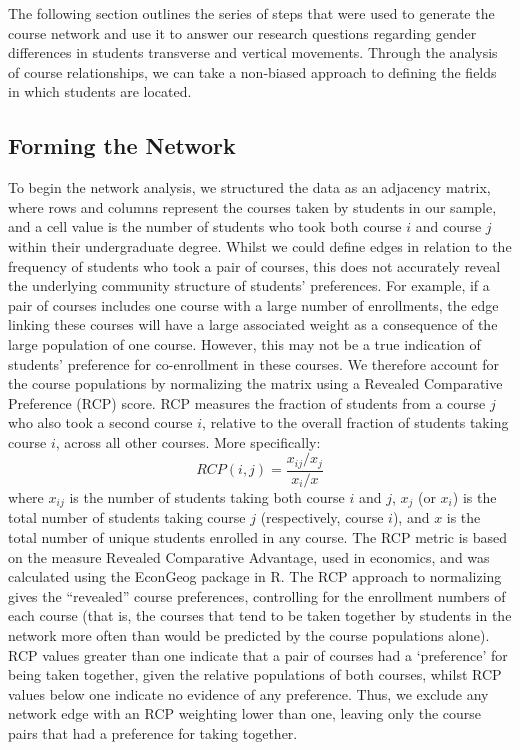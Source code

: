 The following section outlines the series of steps that were used to generate the course network and use it to answer our research questions regarding gender differences in students transverse and vertical movements. Through the analysis of course relationships, we can take a non-biased approach to defining the fields in which students are located. 

\subsection*{Forming the Network}
To begin the network analysis, we structured the data as an adjacency matrix, where rows and columns represent the courses taken by students in our sample, and a cell value is the number of students who took both course $i$ and course $j$ within their undergraduate degree. Whilst we could define edges in relation to the frequency of students who took a pair of courses, this does not accurately reveal the underlying community structure of students' preferences. For example, if a pair of courses includes one course with a large number of enrollments, the edge linking these courses will have a large associated weight as a consequence of the large population of one course. However, this may not be a true indication of students' preference for co-enrollment in these courses. We therefore account for the course populations by normalizing the matrix using a Revealed Comparative Preference (RCP) score. RCP measures the fraction of students from a course $j$ who also took a second course $i$, relative to the overall fraction of students taking course $i$, across all other courses. More specifically: 
$$RCP(i,j) = \frac{x_{ij}/x_j}{x_i/x}$$
where $x_{ij}$ is the number of students taking both course $i$ and $j$, $x_j$ (or $x_i$) is the total number of students taking course $j$ (respectively, course $i$), and $x$ is the total number of unique students enrolled in any course.
The RCP metric is based on the measure Revealed Comparative Advantage, used in economics\cite{Balassa1965}, and was calculated using the EconGeog package in R.\cite{balland2017economic} The RCP approach to normalizing gives the ``revealed'' course preferences, controlling for the enrollment numbers of each course (that is, the courses that tend to be taken together by students in the network more often than would be predicted by the course populations alone). RCP values greater than one indicate that a pair of courses had a `preference' for being taken together, given the relative populations of both courses, whilst RCP values below one indicate no evidence of any preference. Thus, we exclude any network edge with an RCP weighting lower than one, leaving only the course pairs that had a preference for taking together. 

